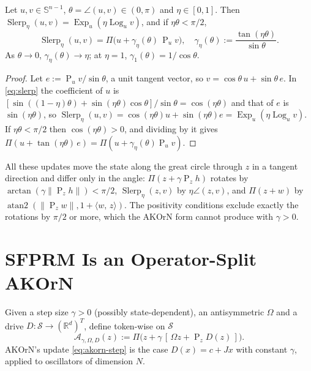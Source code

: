 \documentclass{article}
\theoremstyle{plain}
\theoremstyle{definition}
\theoremstyle{remark}
\newcommand{\R}{\mathbb{R}}
\newcommand{\Sph}{\mathbb{S}}
\newcommand{\ip}[2]{\langle #1,\, #2\rangle}
\newcommand{\norm}[1]{\lVert #1\rVert}
\newcommand{\Proj}{\operatorname{P}}
\newcommand{\Ret}{\Pi}
\newcommand{\Slerp}{\operatorname{Slerp}}
\newcommand{\Exp}{\operatorname{Exp}}
\newcommand{\Log}{\operatorname{Log}}
\begin{document}
\begin{lemma}
\label{lem:slerp}
Let $u,v\in\Sph^{n-1}$, $\theta=\angle(u,v)\in(0,\pi)$ and $\eta\in[0,1]$. Then
$\Slerp_\eta(u,v)=\Exp_u(\eta\Log_u v)$, and if $\eta\theta<\pi/2$,
\begin{equation}
  \Slerp_\eta(u,v) = \Ret\big(u + \gamma_\eta(\theta)\,\Proj_u v\big),
  \quad
  \gamma_\eta(\theta) := \frac{\tan(\eta\theta)}{\sin\theta}.
  \label{eq:gamma-eta}
\end{equation}
As $\theta\to0$, $\gamma_\eta(\theta)\to\eta$; at $\eta=1$, $\gamma_1(\theta)=1/\cos\theta$.
\end{lemma}
\begin{proof}
Let $e:=\Proj_uv/\sin\theta$, a unit tangent vector, so $v=\cos\theta\,u+\sin\theta\,e$. In
\eqref{eq:slerp} the coefficient of $u$ is
$[\sin((1-\eta)\theta)+\sin(\eta\theta)\cos\theta]/\sin\theta=\cos(\eta\theta)$ and that of $e$ is
$\sin(\eta\theta)$, so $\Slerp_\eta(u,v)=\cos(\eta\theta)u+\sin(\eta\theta)e=\Exp_u(\eta\Log_uv)$. If
$\eta\theta<\pi/2$ then $\cos(\eta\theta)>0$, and dividing by it gives
$\Ret(u+\tan(\eta\theta)\,e)=\Ret(u+\gamma_\eta(\theta)\Proj_uv)$.
\end{proof}

\begin{remark}
\label{rem:angle}
All these updates move the state along the great circle through $z$ in a tangent direction and differ
only in the angle: $\Ret(z+\gamma\Proj_zh)$ rotates by $\arctan(\gamma\norm{\Proj_zh})<\pi/2$,
$\Slerp_\eta(z,v)$ by $\eta\angle(z,v)$, and $\Ret(z+w)$ by
$\operatorname{atan2}(\norm{\Proj_zw},1+\ip{w}{z})$. The positivity conditions exclude exactly the
rotations by $\pi/2$ or more, which the AKOrN form cannot produce with $\gamma>0$.
\end{remark}

\section{SFPRM Is an Operator-Split AKOrN}
\label{sec:correspondence}

\begin{definition}
\label{def:gen-akorn}
Given a step size $\gamma>0$ (possibly state-dependent), an antisymmetric $\Omega$ and a drive
$D:\mathcal S\to(\R^d)^T$, define token-wise on $\mathcal S$
\begin{equation}
  \mathcal A_{\gamma,\Omega,D}(z) := \Ret\big(z + \gamma\,[\,\Omega z + \Proj_z D(z)\,]\big).
\end{equation}
AKOrN's update \eqref{eq:akorn-step} is the case $D(x)=c+Jx$ with constant $\gamma$, applied to
oscillators of dimension $N$.
\end{definition}
\end{document}
